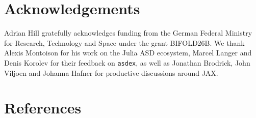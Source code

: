 \documentclass[
]{article}
\begin{document}
\section{Acknowledgements}\label{acknowledgements}

Adrian Hill gratefully acknowledges funding from the German Federal
Ministry for Research, Technology and Space under the grant BIFOLD26B.
We thank Alexis Montoison for his work on the Julia ASD ecosystem,
Marcel Langer and Denis Korolev for their feedback on \texttt{asdex}, as
well as Jonathan Brodrick, John Viljoen and Johanna Hafner for
productive discussions around JAX.

\clearpage
\section*{References}\label{references}
\end{document}
